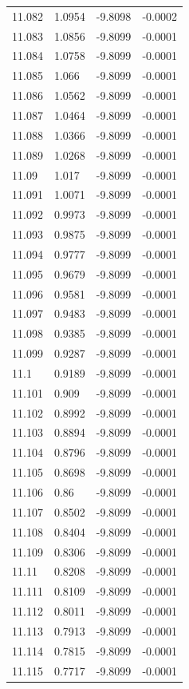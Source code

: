 \begin{tabular}{llll}
11.082 & 1.0954 & -9.8098 & -0.0002 \\
11.083 & 1.0856 & -9.8099 & -0.0001 \\
11.084 & 1.0758 & -9.8099 & -0.0001 \\
11.085 & 1.066 & -9.8099 & -0.0001 \\
11.086 & 1.0562 & -9.8099 & -0.0001 \\
11.087 & 1.0464 & -9.8099 & -0.0001 \\
11.088 & 1.0366 & -9.8099 & -0.0001 \\
11.089 & 1.0268 & -9.8099 & -0.0001 \\
11.09 & 1.017 & -9.8099 & -0.0001 \\
11.091 & 1.0071 & -9.8099 & -0.0001 \\
11.092 & 0.9973 & -9.8099 & -0.0001 \\
11.093 & 0.9875 & -9.8099 & -0.0001 \\
11.094 & 0.9777 & -9.8099 & -0.0001 \\
11.095 & 0.9679 & -9.8099 & -0.0001 \\
11.096 & 0.9581 & -9.8099 & -0.0001 \\
11.097 & 0.9483 & -9.8099 & -0.0001 \\
11.098 & 0.9385 & -9.8099 & -0.0001 \\
11.099 & 0.9287 & -9.8099 & -0.0001 \\
11.1 & 0.9189 & -9.8099 & -0.0001 \\
11.101 & 0.909 & -9.8099 & -0.0001 \\
11.102 & 0.8992 & -9.8099 & -0.0001 \\
11.103 & 0.8894 & -9.8099 & -0.0001 \\
11.104 & 0.8796 & -9.8099 & -0.0001 \\
11.105 & 0.8698 & -9.8099 & -0.0001 \\
11.106 & 0.86 & -9.8099 & -0.0001 \\
11.107 & 0.8502 & -9.8099 & -0.0001 \\
11.108 & 0.8404 & -9.8099 & -0.0001 \\
11.109 & 0.8306 & -9.8099 & -0.0001 \\
11.11 & 0.8208 & -9.8099 & -0.0001 \\
11.111 & 0.8109 & -9.8099 & -0.0001 \\
11.112 & 0.8011 & -9.8099 & -0.0001 \\
11.113 & 0.7913 & -9.8099 & -0.0001 \\
11.114 & 0.7815 & -9.8099 & -0.0001 \\
11.115 & 0.7717 & -9.8099 & -0.0001 \\

\end{tabular}
